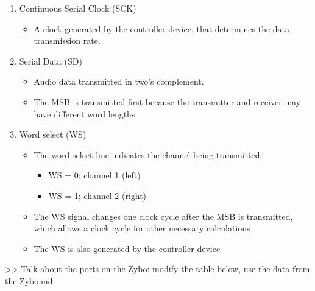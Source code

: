 \begin{enumerate}
    \item Continuous Serial Clock (SCK)
    \begin{itemize}
        \item A clock generated by the controller device, that determines the data transmission rate.
    \end{itemize}
    
    \item Serial Data (SD)
    \begin{itemize}
        \item Audio data transmitted in two's complement. 
        \item The MSB is transmitted first because the transmitter and receiver may have different word lengths.
    \end{itemize}

    \item Word select (WS)
    \begin{itemize}
        \item The word select line indicates the channel being transmitted:
        \begin{itemize}
            \item WS = 0; channel 1 (left)
            \item WS = 1; channel 2 (right)
        \end{itemize}
        \item The WS signal changes one clock cycle after the MSB is transmitted, which allows a clock cycle for other necessary calculations
        \item The WS is also generated by the controller device
    \end{itemize}

\end{enumerate}






>> Talk about the ports on the Zybo: modify the table below, use the data from the Zybo.md

